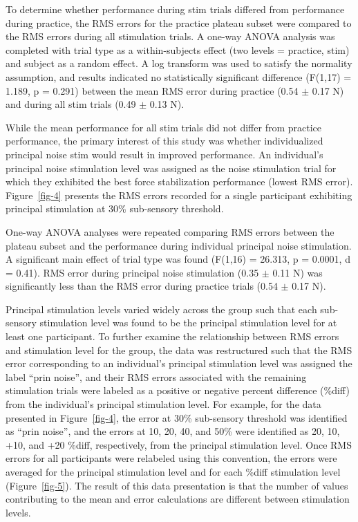 \documentclass[]{cik}%
\begin{document}
To determine whether performance during stim trials differed from
performance during practice, the RMS errors for the practice plateau
subset were compared to the RMS errors during all stimulation trials. A
one-way ANOVA analysis was completed with trial type as a
within-subjects effect (two levels = practice, stim) and subject as a
random effect. A log transform was used to satisfy the normality
assumption, and results indicated no statistically significant
difference (F(1,17) = 1.189, p = 0.291) between the mean RMS error
during practice (0.54 \(\pm\) 0.17 N) and during all stim trials (0.49
\(\pm\) 0.13 N).

While the mean performance for all stim trials did not differ from
practice performance, the primary interest of this study was whether
individualized principal noise stim would result in improved
performance. An individual's principal noise stimulation level was
assigned as the noise stimulation trial for which they exhibited the
best force stabilization performance (lowest RMS error).
Figure~\ref{fig-4} presents the RMS errors recorded for a single
participant exhibiting principal stimulation at 30\% sub-sensory
threshold.

One-way ANOVA analyses were repeated comparing RMS errors between the
plateau subset and the performance during individual principal noise
stimulation. A significant main effect of trial type was found (F(1,16)
= 26.313, p = 0.0001, d = 0.41). RMS error during principal noise
stimulation (0.35 \(\pm\) 0.11 N) was significantly less than the RMS
error during practice trials (0.54 \(\pm\) 0.17 N).

Principal stimulation levels varied widely across the group such that
each sub-sensory stimulation level was found to be the principal
stimulation level for at least one participant. To further examine the
relationship between RMS errors and stimulation level for the group, the
data was restructured such that the RMS error corresponding to an
individual's principal stimulation level was assigned the label ``prin
noise'', and their RMS errors associated with the remaining stimulation
trials were labeled as a positive or negative percent difference
(\%diff) from the individual's principal stimulation level. For example,
for the data presented in Figure~\ref{fig-4}, the error at 30\%
sub-sensory threshold was identified as ``prin noise'', and the errors
at 10, 20, 40, and 50\% were identified as 20, 10, +10, and +20 \%diff,
respectively, from the principal stimulation level. Once RMS errors for
all participants were relabeled using this convention, the errors were
averaged for the principal stimulation level and for each \%diff
stimulation level (Figure~\ref{fig-5}). The result of this data
presentation is that the number of values contributing to the mean and
error calculations are different between stimulation levels.
\end{document}
